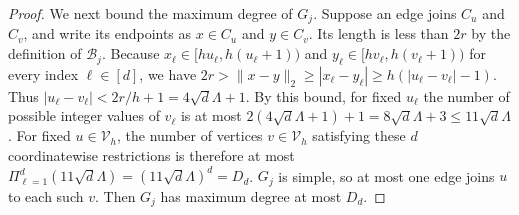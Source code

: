 \documentclass[10pt,a4paper]{amsart}
\begin{document}
\begin{proof}
We next bound the maximum degree of $G_j$.
Suppose an edge joins $C_u$ and $C_v$, and write its endpoints as $x\in C_u$ and $y\in C_v$.
Its length is less than $2r$ by the definition of $\mathcal B_j$.
Because $x_\ell\in[hu_\ell,h(u_\ell+1))$ and $y_\ell\in[hv_\ell,h(v_\ell+1))$ for every index $\ell\in[d]$, we have $2r>\|x-y\|_2\geq|x_\ell-y_\ell|\geq h(|u_\ell-v_\ell|-1)$.
Thus $|u_\ell-v_\ell|<2r/h+1=4\sqrt d\Lambda+1$.
By this bound, for fixed $u_\ell$ the number of possible integer values of $v_\ell$ is at most $2(4\sqrt d\Lambda+1)+1=8\sqrt d\Lambda+3\leq11\sqrt d\Lambda$.
For fixed $u\in\mathcal V_h$, the number of vertices $v\in\mathcal V_h$ satisfying these $d$ coordinatewise restrictions is therefore at most $\Pi_{\ell=1}^d(11\sqrt d\Lambda)=(11\sqrt d\Lambda)^d=D_d$.
$G_j$ is simple, so at most one edge joins $u$ to each such $v$.
Then $G_j$ has maximum degree at most $D_d$.


\end{proof}
\end{document}
